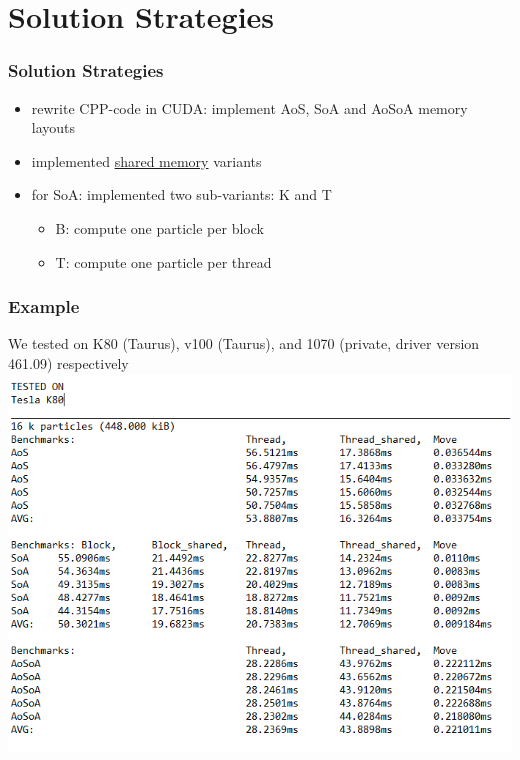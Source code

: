 \documentclass[aspectratio=169]{beamer}
\begin{document}
\section{Solution Strategies}
\begin{frame}
	\frametitle{Solution Strategies}
	\begin{itemize}
		\item rewrite CPP-code in CUDA: implement AoS, SoA and AoSoA memory layouts
		\item implemented \underline{shared memory} variants
		\item for SoA: implemented two sub-variants: K and T
			\begin{itemize}
				\item B: compute one particle per block
				\item T: compute one particle per thread
			\end{itemize}
	\end{itemize}
\end{frame}

\begin{frame}
	\frametitle{Example}
	\tiny We tested on K80 (Taurus), v100 (Taurus), and 1070 (private, driver version 461.09) respectively
	\includegraphics[scale=0.5]{resources/data-example.png}
\end{frame}
\end{document}
